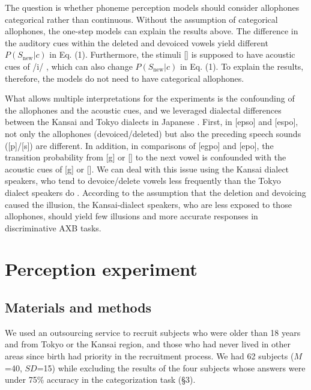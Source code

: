 \documentclass[a4paper,11pt,twocolumn]{article}
\begin{document}
The question is whether phoneme perception models should consider allophones categorical rather than continuous. Without the assumption of categorical allophones, the one-step models can explain the results above. The difference in the auditory cues within the deleted and devoiced vowels yield different $P(S_{\text{new}}|c)$ in Eq. (1). Furthermore, the stimuli [\textctc] is supposed to have acoustic cues of /i/ \cite{kubozono1999japanese_eng}, which can also change $P(S_{\text{new}}|c)$ in Eq. (1). To explain the results, therefore, the models do not need to have categorical allophones.

What allows multiple interpretations for the experiments is the confounding of the allophones and the acoustic cues, and we leveraged dialectal differences between the Kansai and Tokyo dialects in Japanese \cite{kishiyama2022onestep}. First, in [ep\textsubring{\textturnm}so] and [espo], not only the allophones (devoiced/deleted) but also the preceding speech sounds ([p]/[s]) are different. In addition, in comparisons of [egpo] and [e\textctc{}po], the transition probability from [g] or [\textctc] to the next vowel is confounded with the acoustic cues of [g] or [\textctc]. We can deal with this issue using the Kansai dialect speakers, who tend to devoice/delete vowels less frequently than the Tokyo dialect speakers do \cite{byun2011_eng, byun2012_eng}. According to the assumption that the deletion and devoicing caused the illusion, the Kansai-dialect speakers, who are less exposed to those allophones, should yield few illusions and more accurate responses in discriminative AXB tasks.

\section{Perception experiment}

\subsection{Materials and methods}

We used an outsourcing service to recruit subjects who were older than 18 years and from Tokyo or the Kansai region, and those who had never lived in other areas since birth had priority in the recruitment process. We had 62 subjects ($M$=40, $SD$=15) while excluding the results of the four subjects whose answers were under 75\% accuracy in the categorization task (\S3).
\end{document}

